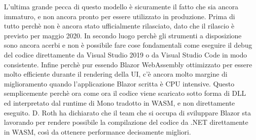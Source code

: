 L'ultima grande pecca di questo modello \`e sicuramente il fatto che sia ancora immaturo, e non ancora pronto per essere utilizzato in produzione.
Prima di tutto perch\`e non \`e ancora stato ufficialmente rilasciato, dato che il rilascio \`e previsto per maggio 2020.
In secondo luogo perch\`e gli strumenti a disposizione sono ancora acerbi e non \`e possibile fare cose fondamentali come eseguire il debug del codice direttamente da Visual Studio 2019 o da Visual Studio Code in modo consistente.
Infine perch\`e pur essendo Blazor WebAssembly ottimizzato per essere molto efficiente durante il rendering della UI, c'\`e ancora molto margine di miglioramento quando l'applicazione Blazor scritta \`e CPU intensive.
Questo semplicemente perch\`e ora come ora il codice viene scaricato sotto forma di DLL ed interpretato dal runtime di Mono tradotto in WASM, e non direttamente eseguito.
D. Roth ha dichiarato che il team che si occupa di sviluppare Blazor sta lavorando per rendere possibile la compilazione del codice da .NET direttamente in WASM, cos\`i da ottenere performance decisamente migliori\cite{blazorModelsScenarios}.